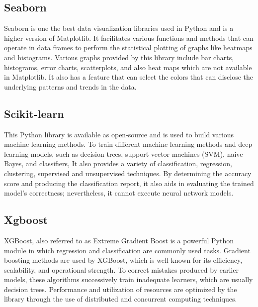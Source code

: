 \subsection{Seaborn}
Seaborn is one the best data visualization libraries used in Python and is a higher version of Matplotlib. It facilitates various functions and methods that can operate in data frames to perform the statistical plotting of graphs like heatmaps and histograms. Various graphs provided by this library include bar charts, histograms, error charts, scatterplots, and also heat maps which are not available in Matplotlib. It also has a feature that can select the colors that can disclose the underlying patterns and trends in the data.

\subsection{Scikit-learn}
This Python library is available as open-source and is used to build various machine learning methods. To train different machine learning methods and deep learning models, such as decision trees, support vector machines (SVM), naive Bayes, and classifiers, It also provides a variety of classification, regression, clustering, supervised and unsupervised techniques. By determining the accuracy score and producing the classification report, it also aids in evaluating the trained model's correctness; nevertheless, it cannot execute neural network models.

\subsection{Xgboost}
XGBoost, also referred to as Extreme Gradient Boost is a powerful Python module in which regression and classification are commonly used tasks. Gradient boosting methods are used by XGBoost, which is well-known for its efficiency, scalability, and operational strength. To correct mistakes produced by earlier models, these algorithms successively train inadequate learners, which are usually decision trees. Performance and utilization of resources are optimized by the library through the use of distributed and concurrent computing techniques.

